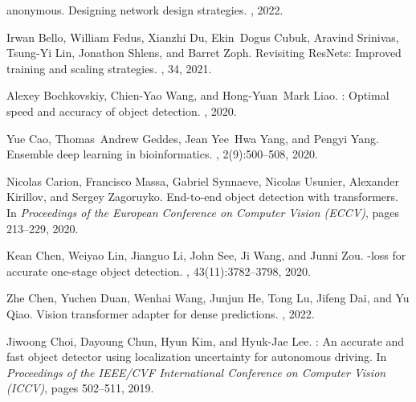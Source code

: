 \documentclass[10pt,twocolumn,letterpaper]{article}
\begin{document}
{\small
			\begin{thebibliography}{100}\itemsep=-1pt
				
				anonymous.
				\newblock Designing network design strategies.
				, 2022.
				
				Irwan Bello, William Fedus, Xianzhi Du, Ekin~Dogus Cubuk, Aravind Srinivas,
				Tsung-Yi Lin, Jonathon Shlens, and Barret Zoph.
				\newblock Revisiting {ResNets}: Improved training and scaling strategies.
				,
				34, 2021.
				
				Alexey Bochkovskiy, Chien-Yao Wang, and Hong-Yuan~Mark Liao.
				: Optimal speed and accuracy of object detection.
				, 2020.
				
				Yue Cao, Thomas~Andrew Geddes, Jean Yee~Hwa Yang, and Pengyi Yang.
				\newblock Ensemble deep learning in bioinformatics.
				, 2(9):500--508, 2020.
				
				Nicolas Carion, Francisco Massa, Gabriel Synnaeve, Nicolas Usunier, Alexander
				Kirillov, and Sergey Zagoruyko.
				\newblock End-to-end object detection with transformers.
				\newblock In {\em Proceedings of the European Conference on Computer Vision
					(ECCV)}, pages 213--229, 2020.
				
				Kean Chen, Weiyao Lin, Jianguo Li, John See, Ji Wang, and Junni Zou.
				-loss for accurate one-stage object detection.
				, 43(11):3782--3798, 2020.
				
				Zhe Chen, Yuchen Duan, Wenhai Wang, Junjun He, Tong Lu, Jifeng Dai, and Yu
				Qiao.
				\newblock Vision transformer adapter for dense predictions.
				, 2022.
				
				Jiwoong Choi, Dayoung Chun, Hyun Kim, and Hyuk-Jae Lee.
				: An accurate and fast object detector using
				localization uncertainty for autonomous driving.
				\newblock In {\em Proceedings of the IEEE/CVF International Conference on
					Computer Vision (ICCV)}, pages 502--511, 2019.
				

\end{thebibliography}}
\end{document}
